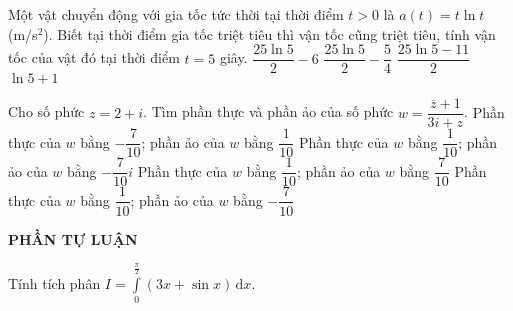 	\begin{ex}%
		Một vật chuyển động với gia tốc tức thời tại thời điểm $t>0$ là $a(t)=t\ln t$ (m/s$^2$). Biết tại thời điểm gia tốc triệt tiêu thì vận tốc cũng triệt tiêu, tính vận tốc của vật đó tại thời điểm $t=5$ giây.
		\choice
		{\True $\dfrac{25\ln 5}{2}-6$}
		{$\dfrac{25\ln 5}{2}-\dfrac{5}{4}$}
		{$\dfrac{25\ln 5-11}{2}$}
		{$\ln 5+1$}
	\end{ex}
	\begin{ex}%
		Cho số phức $z=2+i$. Tìm phần thực và phần ảo của số phức $w=\dfrac{\overline{z}+1}{3i+z}$.
		\choice
		{Phần thực của $w$ bằng $-\dfrac{7}{10}$; phần ảo của $w$ bằng $\dfrac{1}{10}$}
		{Phần thực của $w$ bằng $\dfrac{1}{10}$; phần ảo của $w$ bằng $-\dfrac{7}{10}i$}
		{Phần thực của $w$ bằng $\dfrac{1}{10}$; phần ảo của $w$ bằng $\dfrac{7}{10}$}
		{\True Phần thực của $w$ bằng $\dfrac{1}{10}$; phần ảo của $w$ bằng $-\dfrac{7}{10}$}
	\end{ex}
	
	\noindent\textbf{PHẦN TỰ LUẬN}
		\begin{bt}%
		Tính tích phân $I=\displaystyle\int\limits_{0}^{\frac{\pi}{2}}(3x+\sin x)\,\mathrm{d}x$.
	\end{bt}
	
